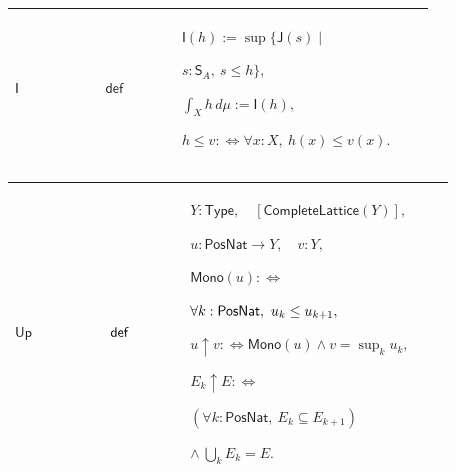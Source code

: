\documentclass[12pt,reqno]{amsart}
\theoremstyle{blueplain}
\numberwithin{equation}{section}
\begin{document}
{\scriptsize \setlength{\parskip}{0pt}\nointerlineskip
\noindent 
\begin{tabular}{|@{}>{\centering\arraybackslash}m{0.19251\linewidth}|>{\centering\arraybackslash}m{0.16845\linewidth}|>{\centering\arraybackslash}m{0.53904\linewidth}|}
\hline
\hypertarget{def:I}{$\displaystyle \mathsf{I}$} & $\displaystyle \mathsf{def}
$ & $\displaystyle \mathsf{I}(h):=\sup\{\mathsf{J}(s)\mid$\par$\displaystyle %
s:\mathsf{S}_A,\ s\le h\},$\par$\displaystyle \int_Xh\,d\mu:=\mathsf{I}(h),$%
\par$\displaystyle h\le v:\Longleftrightarrow\forall x:X,\ h(x)\le v(x).$ \\ 
\hline
\end{tabular}%
}

{\scriptsize \setlength{\parskip}{0pt}\nointerlineskip
\noindent 
\begin{tabular}{|@{}>{\centering\arraybackslash}m{0.19251\linewidth}|>{\centering\arraybackslash}m{0.16845\linewidth}|>{\centering\arraybackslash}m{0.53904\linewidth}|}
\hline
\hypertarget{def:Up}{$\displaystyle \mathsf{Up}$} & $\displaystyle \mathsf{%
def}$ & $\displaystyle Y:\mathsf{Type},\quad[\mathsf{CompleteLattice}(Y)],$%
\par$\displaystyle u:\mathsf{PosNat}\to Y,\quad v:Y,$\par$\displaystyle 
\mathsf{Mono}(u):\Longleftrightarrow$\par$\displaystyle \forall k:\mathsf{%
PosNat},\ u_k\le u_{k+1},$\par$\displaystyle u\uparrow v:\Longleftrightarrow%
\mathsf{Mono}(u)\land v=\sup_k u_k,$\par$\displaystyle E_k\uparrow
E:\Longleftrightarrow$\par$\displaystyle (\forall k:\mathsf{PosNat},\
E_k\subseteq E_{k+1})$\par$\displaystyle \land\ \bigcup_k E_k=E.$ \\ \hline
\end{tabular}%
}
\end{document}
